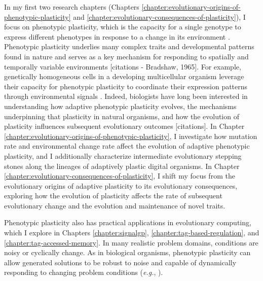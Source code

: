 In my first two research chapters (Chapters \ref{chapter:evolutionary-origins-of-phenotypic-plasticity} and \ref{chapter:evolutionary-consequences-of-plasticity}), I focus on phenotypic plasticity, which is the capacity for a single genotype to express different phenotypes in response to a change in its environment \citep{west-eberhard_developmental_2003}.
Phenotypic plasticity underlies many complex traits and developmental patterns found in nature and serves as a key mechanism for responding to spatially and temporally variable environments [citations - Bradshaw, 1965].
For example, genetically homogeneous cells in a developing multicellular organism leverage their capacity for phenotypic plasticity to coordinate their expression patterns through environmental signals \citep{schlichting_origins_2003}.
Indeed, biologists have long been interested in understanding how adaptive phenotypic plasticity evolves, the mechanisms underpinning that plasticity in natural organisms, and how the evolution of plasticity influences subsequent evolutionary outcomes [citations].
In Chapter \ref{chapter:evolutionary-origins-of-phenotypic-plasticity}, I investigate how mutation rate and environmental change rate affect the evolution of adaptive phenotypic plasticity, and I additionally characterize intermediate evolutionary stepping stones along the lineages of adaptively plastic digital organisms. 
In Chapter \ref{chapter:evolutionary-consequences-of-plasticity}, I shift my focus from the evolutionary origins of adaptive plasticity to its evolutionary consequences, exploring how the evolution of plasticity affects the rate of subsequent evolutionary change and the evolution and maintenance of novel traits. 


Phenotypic plasticity also has practical applications in evolutionary computing, which I explore in Chapters \ref{chapter:signalgp}, \ref{chapter:tag-based-regulation}, and \ref{chapter:tag-accessed-memory}.
In many realistic problem domains, conditions are noisy or cyclically change.
As in biological organisms, phenotypic plasticity can allow generated solutions to be robust to noise and capable of dynamically responding to changing problem conditions (\textit{e.g.}, \citealt{soltoggio_born_2018}).

